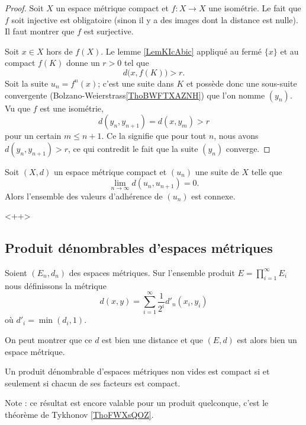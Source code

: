 \begin{proof}
    Soit \( X\) un espace métrique compact et \( f\colon X\to X\) une isométrie. Le fait que \( f\) soit injective est obligatoire (sinon il y a des images dont la distance est nulle). Il faut montrer que \( f\) est surjective.

    Soit \( x\in X\) hors de \( f(X)\). Le lemme \ref{LemKIcAbic} appliqué au fermé \( \{ x \}\) et au compact \( f(K)\) donne un \( r>0\) tel que
    \begin{equation}
        d\big( x,f(K)\big)>r.
    \end{equation}
    Soit la suite \( u_n=f^n(x)\); c'est une suite dans \( K\) et possède donc une sous-suite convergente (Bolzano-Weierstrass\ref{ThoBWFTXAZNH}) que l'on nomme \( (y_n)\). Vu que \( f\) est une isométrie,
    \begin{equation}
        d(y_{n},y_{n+1})=d(x,y_m)>r
    \end{equation}
    pour un certain \( m\leq n+1\). Ce la signifie que pour tout \( n\), nous avons \( d(y_n,y_{n+1})>r\), ce qui contredit le fait que la suite \( (y_n)\) converge.
\end{proof}

\begin{proposition} \label{PropLHWACDU}
    Soit \( (X,d)\) un espace métrique compact et \( (u_n)\) une suite de \( X\) telle que
    \begin{equation}
        \lim_{n\to \infty} d(u_n,u_{n+1})=0.
    \end{equation}
    Alors l'ensemble des valeurs d'adhérence de \( (u_n)\) est connexe.
\end{proposition}
<++>

\subsection{Produit dénombrables d'espaces métriques}

\begin{definition}
    Soient \( (E_n,d_n)\) des espaces métriques. Sur l'ensemble produit \( E=\prod_{i=1}^{\infty}E_i\) nous définissons la métrique
    \begin{equation}
        d(x,y)=\sum_{i=1}^{\infty}\frac{1}{ 2^i }d'_n(x_i,y_i)
    \end{equation}
    où \( d'_i=\min(d_i,1)\).
\end{definition}
On peut montrer que ce \( d\) est bien une distance et que \( (E,d)\) est alors bien un espace métrique.

\begin{theorem}\label{ThoCDhbZbf}
    Un produit dénombrable d'espaces métriques non vides est compact si et seulement si chacun de ses facteurs est compact.
\end{theorem}
Note : ce résultat est encore valable pour un produit quelconque, c'est le théorème de Tykhonov \ref{ThoFWXsQOZ}.
